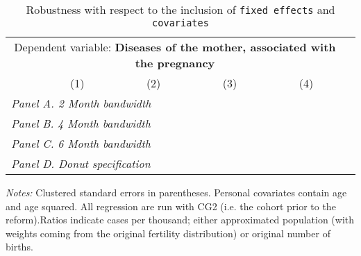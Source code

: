  \begin{table}[H] \begin{threeparttable} \centering \caption{Robustness with respect to the inclusion of \texttt{fixed effects} and \texttt{covariates}} {\def\sym#1{\ifmmode^{#1}\else\(^{#1}\)\fi} \begin{tabular}{l*{5}{c}} \toprule \multicolumn{5}{c}{Dependent variable: \textbf{Diseases of the mother, associated with the pregnancy}} \\ \cmidrule(lr){2-5}
            &\multicolumn{1}{c}{(1)}&\multicolumn{1}{c}{(2)}&\multicolumn{1}{c}{(3)}&\multicolumn{1}{c}{(4)}\\
\midrule
 \multicolumn{5}{l}{\emph{Panel A. 2 Month bandwidth}} \\    \midrule\multicolumn{5}{l}{\emph{Panel B. 4 Month bandwidth}} \\    \midrule\multicolumn{5}{l}{\emph{Panel C. 6 Month bandwidth}} \\    \midrule\multicolumn{5}{l}{\emph{Panel D. Donut specification}} \\    \midrule  
\bottomrule \end{tabular} } \begin{tablenotes} \item \scriptsize \emph{Notes:} Clustered standard errors in parentheses. Personal covariates contain age and age squared. All regression are run with CG2 (i.e. the cohort prior to the reform).Ratios indicate cases per thousand; either approximated population (with weights coming from the original fertility distribution) or original number of births. \end{tablenotes} \end{threeparttable} \end{table} 
